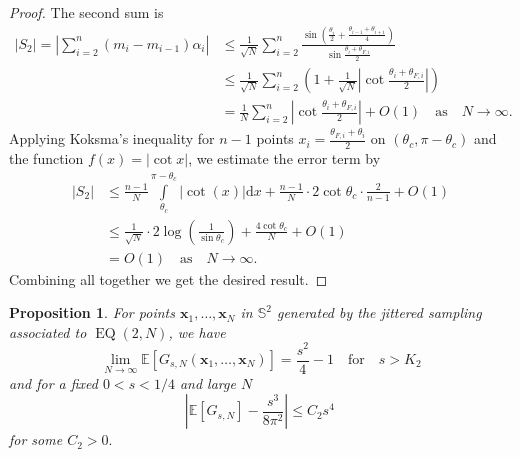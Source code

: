 \documentclass[a4paper,11pt]{amsart}
\newtheorem{prop}{Proposition}
\begin{document}
\begin{proof}
The second sum is
\begin{align*}
    |S_2|=\left|\sum_{i=2}^n(m_i-m_{i-1})\alpha_i\right|&\leq\frac{1}{\sqrt{N}} \sum\limits_{i=2}^n\frac{\sin\left(\tfrac{\theta_i}{2}+\tfrac{\theta_{i-1}+\theta_{i+1}}{4}\right)}{\sin\tfrac{\theta_{i}+\theta_{F,i}}{2}}
    \\&\leq \frac{1}{\sqrt{N}} \sum\limits_{i=2}^n\left(1+\tfrac{1}{\sqrt{N}}\left|\cot\tfrac{\theta_{i}+\theta_{F,i}}{2}\right|\right)
    \\ &=\frac{1}{N}\sum\limits_{i=2}^n\left|\cot\tfrac{\theta_{i}+\theta_{F,i}}{2}\right|+O(1)\quad \text{as}\quad N\rightarrow\infty.
\end{align*}
Applying Koksma's inequality for $n-1$ points $x_i=\frac{\theta_{F,i}+\theta_i}{2}$ on $(\theta_c,\pi-\theta_c)$ and the function $f(x)=|\cot x|$, we estimate the error term by
\begin{align*}
   |S_2| &\leq \frac{n-1}{N}\int\limits_{\theta_c}^{\pi-\theta_c}|\cot(x)|\mathrm{d}x+\frac{n-1}{N}\cdot 2\cot \theta_c\cdot \frac{2}{n-1}+O(1)
    \\ &\leq\frac{1}{\sqrt{N}}\cdot 2\log\left(\frac{1}{\sin\theta_c}\right)+\frac{4\cot \theta_c}{N}+O(1)
    \\ & =O\left(1\right)\quad \text{as}\quad N\rightarrow\infty.
\end{align*}
Combining all together we get the desired result.
\end{proof} 


\begin{prop}
 For points $\mathbf{x}_1,\dots,\mathbf{x}_N$ in $\mathbb{S}^2$ generated by the jittered sampling associated to $\operatorname{EQ}(2,N)$, we have
\begin{equation*}
     \lim\limits_{N\rightarrow\infty}\mathbb{E}[G_{s,N}(\mathbf{x}_1,\dots,\mathbf{x}_N)]=\frac{s^2}{4}-1\quad\text{for}\quad s>K_2
\end{equation*}
and for a fixed $0<s<1/4$ and large $N$
\begin{equation*}
   \left|\mathbb{E}[G_{s,N}]-\frac{s^3}{8\pi^2}\right|\leq C_2s^4\,
\end{equation*}
for some $C_2>0.$
\end{prop}
   
\end{document}
